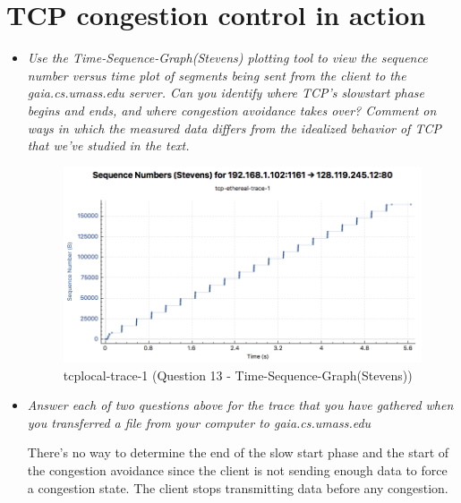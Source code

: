 \documentclass[11pt]{article}
\begin{document}
\section{TCP congestion control in action}

\begin{itemize}
	\setlength\itemsep{.5cm}

	\item
		\textit{Use the Time-Sequence-Graph(Stevens) plotting tool to view the sequence number versus time plot of segments being sent from the client to the gaia.cs.umass.edu server. Can you identify where TCP’s slowstart phase begins and ends, and where congestion avoidance takes over? Comment on ways in which the measured data differs from the idealized behavior of TCP that we’ve studied in the text.}
		
		\begin{figure}[H]
		\centering
		\caption{tcplocal-trace-1 (Question 13 - Time-Sequence-Graph(Stevens))}
		\includegraphics[width=\textwidth]{10}
		\end{figure}

	\item
		\textit{Answer each of two questions above for the trace that you have gathered when you transferred a file from your computer to gaia.cs.umass.edu}
		\par There's no way to determine the end of the slow start phase and the start of the congestion avoidance since the client is not sending enough data to force a congestion state. The client stops transmitting data before any congestion.

\end{itemize}
\end{document}
